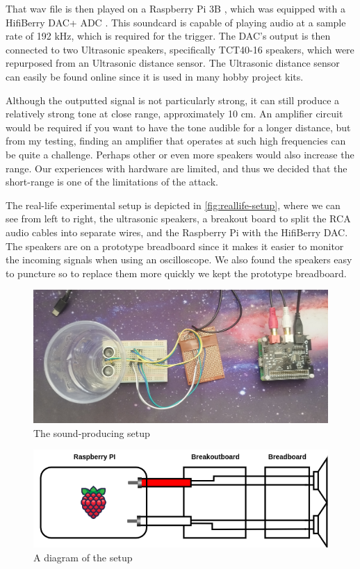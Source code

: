 \documentclass{report}
\theoremstyle{definition}
\theoremstyle{remark}
\begin{document}
That wav file is then played on a Raspberry Pi 3B \cite{RASPBERRY}, which was equipped with a HifiBerry DAC+ ADC \cite{HIFIBERRY}. This soundcard is capable of playing audio at a sample rate of 192 kHz, which is required for the trigger. The DAC's output is then connected to two Ultrasonic speakers, specifically TCT40-16 speakers, which were repurposed from an Ultrasonic distance sensor. The Ultrasonic distance sensor can easily be found online since it is used in many hobby project kits. 

Although the outputted signal is not particularly strong, it can still produce a relatively strong tone at close range, approximately 10 cm. An amplifier circuit would be required if you want to have the tone audible for a longer distance, but from  my testing, finding an amplifier that operates at such high frequencies can be quite a challenge. Perhaps other or even more speakers would also increase the range. Our experiences with hardware are limited, and thus we decided that the short-range is one of the limitations of the attack.

The real-life experimental setup is depicted in \autoref{fig:reallife-setup}, where we can see from left to right, the ultrasonic speakers, a breakout board to split the RCA audio cables into separate wires, and the Raspberry Pi with the HifiBerry DAC. The speakers are on a prototype breadboard since it makes it easier to monitor the incoming signals when using an oscilloscope. We also found the speakers easy to puncture so to replace them more quickly we kept the prototype breadboard.

\begin{figure}[!hbt]
    \centering
    \includegraphics[width=\textwidth]{img/setup.jpg}
    \caption{The sound-producing setup}
    \label{fig:reallife-setup}
\end{figure}

\begin{figure}[!hbt]
    \centering
    \includegraphics[width=\textwidth]{img/diagram.png}
    \caption{A diagram of the setup}
    \label{fig:diagram-setup}
\end{figure}
\end{document}
